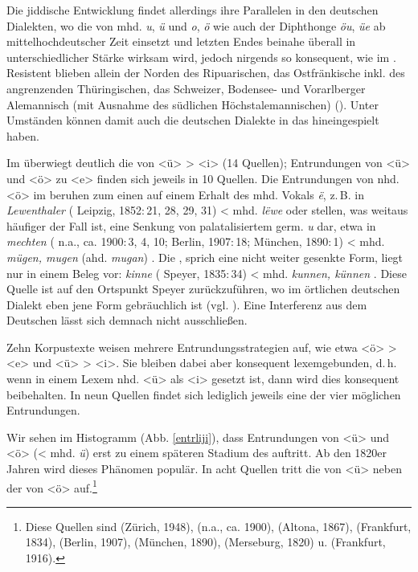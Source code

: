  
Die jiddische Entwicklung findet allerdings ihre Parallelen in den deutschen Dialekten, wo die  von mhd. \textit{u}, \textit{ü} und \textit{o}, \textit{ö} wie auch der Diphthonge \textit{öu}, \textit{üe} ab mittelhochdeutscher Zeit einsetzt und letzten Endes beinahe überall in unterschiedlicher Stärke wirksam wird, jedoch nirgends so konsequent, wie im . Resistent blieben allein der Norden des Ripuarischen, das Ostfränkische inkl. des angrenzenden Thüringischen, das Schweizer, Bodensee- und Vorarlberger Alemannisch (mit Ausnahme des südlichen Höchstalemannischen) (\cite[204–208]{Schirmunski1962}). Unter Umständen können damit auch die deutschen Dialekte in das  hineingespielt haben.
 
 Im  überwiegt deutlich die  von <ü> > <i> (14 Quellen); Entrundungen von <ü> und <ö> zu <e> finden sich jeweils in 10 Quellen. Die Entrundungen von nhd. <ö> im  beruhen zum einen auf einem Erhalt des mhd. Vokals \textit{ë}, z.\,B. in \textit{Lewenthaler}  ( Leipzig, 1852:\,21, 28, 29, 31) < mhd. \textit{lëwe} \parencite[Bd. 1, Sp. 1893]{Lexer1992} oder stellen, was weitaus häufiger der Fall ist, eine Senkung von palatalisiertem germ. \textit{u} dar, etwa in \textit{mechten}  ( n.a., ca. 1900:\,3, 4, 10;  Berlin, 1907:\,18;  München, 1890:\,1) < mhd. \textit{mügen, mugen} (ahd. \textit{mugan}) \parencite[Bd. 1, Sp. 2218]{Lexer1992}. Die  , sprich eine nicht weiter gesenkte Form, liegt nur in einem Beleg vor: \textit{kinne}  ( Speyer, 1835:\,34) < mhd. \textit{kunnen, künnen} \parencite[Bd. 1, Sp. 1778]{Lexer1992}. Diese Quelle ist auf den Ortspunkt Speyer zurückzuführen, wo im örtlichen deutschen Dialekt eben jene Form gebräuchlich ist (vgl.  \citeyear[Bd. 4, Sp. 445]{PfaelzWB}). Eine Interferenz aus dem Deutschen lässt sich demnach nicht ausschließen.
 
Zehn Korpustexte weisen mehrere Entrundungsstrategien auf, wie etwa <ö> > <e> und <ü> > <i>. Sie bleiben dabei aber konsequent lexemgebunden, d.\,h. wenn in einem Lexem nhd. <ü> als <i> gesetzt ist, dann wird dies konsequent beibehalten. In neun Quellen findet sich lediglich jeweils eine der vier möglichen Entrundungen. 

 Wir sehen im Histogramm (Abb. \ref{entrliji}), dass Entrundungen von <ü> und <ö> (< mhd. \textit{ü}) erst zu einem späteren Stadium des  auftritt. Ab den 1820er Jahren wird dieses Phänomen populär. In acht Quellen tritt die  von <ü> neben der von <ö> auf.\footnote{Diese Quellen sind  (Zürich, 1948),  (n.a., ca. 1900),  (Altona, 1867),  (Frankfurt, 1834),  (Berlin, 1907),  (München, 1890),  (Merseburg, 1820) u.  (Frankfurt, 1916).}
 
